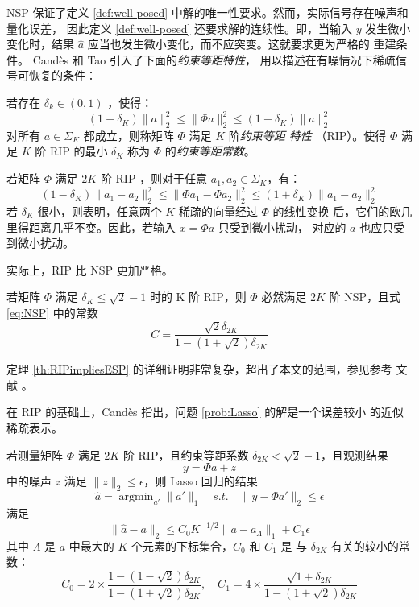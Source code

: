 NSP 保证了定义
\ref{def:well-posed} 中解的唯一性要求。然而，实际信号存在噪声和量化误差，
因此定义 \ref{def:well-posed} 还要求解的连续性。即，当输入 $y$ 发生微小
变化时，结果 $\hat a$ 应当也发生微小变化，而不应突变。这就要求更为严格的
重建条件。 Cand\`es 和 Tao 引入了下面的\emph{约束等距特性}，
用以描述在有噪情况下稀疏信号可恢复的条件：
\begin{definition}[约束等距特性] 若存在 $\delta_k \in (0,1)$ ，使得：
\begin{equation}
(1 - \delta_K) \|a\|_2^2 \leq \|\Phi a\|_2^2 \leq (1 + \delta_K) \|a\|_2^2
\end{equation}
对所有 $a \in \Sigma_K$ 都成立，则称矩阵 $\Phi$ 满足 $K$ 阶\emph{约束等距
特性} （RIP）。使得 $\Phi$ 满足 $K$ 阶 RIP 的最小 $\delta_K$ 称为
$\Phi$ 的\emph{约束等距常数}。
\end{definition}

若矩阵 $\Phi$ 满足 $2K$ 阶 RIP ，则对于任意 $a_1, a_2 \in \Sigma_K$，有：
\begin{equation}
(1 - \delta_K) \|a_1 - a_2\|_2^2 \leq \|\Phi a_1 - \Phi a_2\|_2^2
\leq (1 + \delta_K) \|a_1 - a_2\|_2^2
\end{equation}
若 $\delta_K$ 很小，则表明，任意两个 $K$-稀疏的向量经过 $\Phi$ 的线性变换
后，它们的欧几里得距离几乎不变。因此，若输入 $x = \Phi a$ 只受到微小扰动，
对应的 $a$ 也应只受到微小扰动。

实际上，RIP 比 NSP 更加严格。
\begin{theorem} \label{th:RIPimpliesESP}
若矩阵 $\Phi$ 满足 $\delta_K \leq \sqrt{2} - 1$ 时的 K 阶 RIP，则
$\Phi$ 必然满足 $2K$ 阶 NSP，且式 \ref{eq:NSP} 中的常数
\begin{equation}
C = \frac{\sqrt{2} \delta_{2K}}{1 - (1 + \sqrt{2}) \delta_{2K}}
\end{equation}
\end{theorem}

定理 \ref{th:RIPimpliesESP} 的详细证明非常复杂，超出了本文的范围，参见参考
文献 \cite{IntroCS}。

在 RIP 的基础上，Cand\`es 指出，问题 \ref{prob:Lasso} 的解是一个误差较小
的近似稀疏表示。
\begin{theorem} \label{th:l1recovery}
若测量矩阵 $\Phi$ 满足 $2K$ 阶 RIP，且约束等距系数 $\delta_{2K} < 
\sqrt{2} - 1$，且观测结果
\begin{equation} \label{eqn:observe}
y = \Phi a + z
\end{equation}
中的噪声 $z$ 满足 $\|z\|_2 \leq \epsilon$，则 Lasso 回归的结果
\begin{equation}
\hat a = \mathop{\arg\min}_{a'} \|a'\|_1 \quad s.t. \quad \|y-\Phi a'\|_2
\leq \epsilon
\end{equation}
满足
\begin{equation}
\|\hat a - a\|_2 \leq C_0 K^{-1/2} \|a - a_{\Lambda}\|_1 + C_1 \epsilon
\end{equation}
其中 $\Lambda$ 是 $a$ 中最大的 $K$ 个元素的下标集合，$C_0$ 和 $C_1$ 是
与 $\delta_{2K}$ 有关的较小的常数：
\begin{equation}
C_0 = 2 \times \frac{1 - (1-\sqrt{2}) \delta_{2K}}{1 - (1+\sqrt{2})
\delta_{2K}}, \quad C_1 = 4 \times \frac{\sqrt{1 + \delta_{2K}}}
{1 - (1 + \sqrt{2}) \delta_{2K}}
\end{equation}
\end{theorem}

